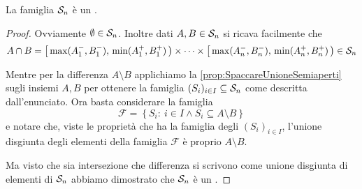 \begin{lemma}\label{lem:SemianelloSemiAperti}
	La famiglia $\S_n$ è un \semiring{}.
\end{lemma}
\begin{proof}
	Ovviamente $\emptyset\in\S_n$.
	Inoltre dati $A,B\in\S_n$ si ricava facilmente che
	\begin{equation*}
		A\cap B=\co{\max(A^-_1,B^-_1)}{\min(A^+_1,B^+_1)}\times\cdots\times\co{\max(A^-_n,B^-_n)}{\min(A^+_n,B^+_n)}\in\S_n
	\end{equation*}

	Mentre per la differenza $A\setminus B$ applichiamo la \cref{prop:SpaccareUnioneSemiaperti} sugli insiemi $A,B$ per ottenere la famiglia $(S_i)_{i\in I}\subseteq \S_n$ come descritta dall'enunciato.
	Ora basta considerare la famiglia
	\begin{equation*}
		\mathcal F=\left\{S_i:\ i\in I\wedge S_i\subseteq A\setminus B\right\}
	\end{equation*}
	e notare che, viste le proprietà che ha la famiglia degli $(S_i)_{i\in I}$, l'unione disgiunta degli elementi della famiglia $\mathcal F$ è proprio $A\setminus B$.
	
	Ma visto che sia intersezione che differenza si scrivono come unione disgiunta di elementi di $\S_n$ abbiamo dimostrato che $\S_n$ è un \semiring{}.
\end{proof}

